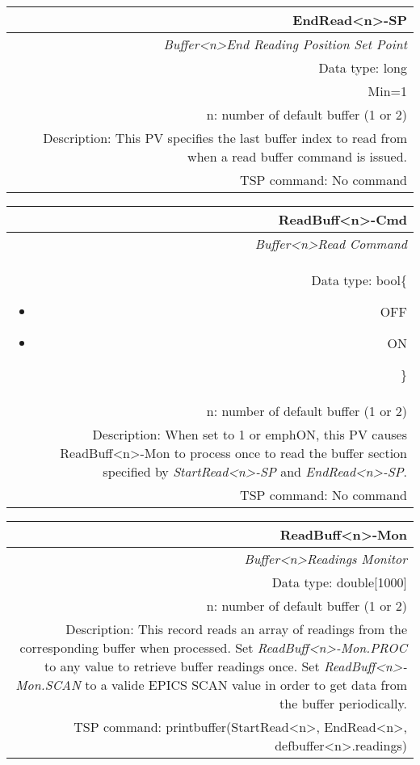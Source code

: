 \documentclass[openany]{article}
\begin{document}
		\begin{tabular}{N}
			\hline
			\bfseries EndRead\textless n\textgreater-SP\label{pv:endread-sp} \\ \hline
			\emph{Buffer\textless n\textgreater End Reading Position Set Point} \\
			Data type: long \\
			Min=1 \\
			n: number of default buffer (1 or 2) \\
			Description: This PV specifies the last buffer index to read from when a read buffer command is issued. \\
			TSP command: No command
		\end{tabular}

		\begin{tabular}{N}
			\hline
			\bfseries ReadBuff\textless n\textgreater-Cmd\label{pv:readbuff-cmd} \\ \hline
			\emph{Buffer\textless n\textgreater Read Command} \\
			Data type: bool\{\begin{itemize}[noitemsep]
				\small
				\item[] OFF
				\item[] ON
			\end{itemize}\} \\
			n: number of default buffer (1 or 2) \\
			Description: When set to 1 or emph{ON}, this PV causes ReadBuff\textless n\textgreater-Mon to process once to read the buffer section specified by \emph{StartRead\textless n\textgreater-SP} and \emph{EndRead\textless n\textgreater-SP}. \\
			TSP command: No command
		\end{tabular}

		\begin{tabular}{N}
			\hline
			\bfseries ReadBuff\textless n\textgreater-Mon\label{pv:readbuff-mon} \\ \hline
			\emph{Buffer\textless n\textgreater Readings Monitor} \\
			Data type: double[1000] \\
			n: number of default buffer (1 or 2) \\
			Description: This record reads an array of readings from the corresponding buffer when processed.  Set \emph{ReadBuff\textless n\textgreater-Mon.PROC} to any value to retrieve buffer readings once. Set \emph{ReadBuff\textless n\textgreater-Mon.SCAN} to a valide EPICS SCAN value in order to get data from the buffer periodically. \\
			TSP command: printbuffer(StartRead\textless n\textgreater, EndRead\textless n\textgreater, defbuffer\textless n\textgreater.readings)
		\end{tabular}
\end{document}
